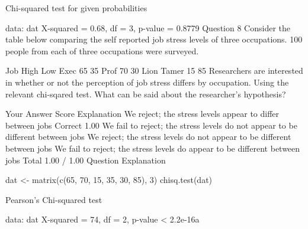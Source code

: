     Chi-squared test for given probabilities

data:  dat 
X-squared = 0.68, df = 3, p-value = 0.8779
Question 8
Consider the table below comparing the self reported job stress levels of three occupations. 100 people from each of three occupations were surveyed.

Job	High	Low
Exec	65	35
Prof	70	30
Lion Tamer	15	85
Researchers are interested in whether or not the perception of job stress differs by occupation. Using the relevant chi-sqared test. What can be said about the researcher's hypothesis?

Your Answer		Score	Explanation
We reject; the stress levels appear to differ between jobs	Correct	1.00	
We fail to reject; the stress levels do not appear to be different between jobs			
We reject; the stress levels do not appear to be different between jobs			
We fail to reject; the stress levels do appear to be different between jobs			
Total		1.00 / 1.00	
Question Explanation

dat <- matrix(c(65, 70, 15, 35, 30, 85), 3)
chisq.test(dat)

    Pearson's Chi-squared test

data:  dat 
X-squared = 74, df = 2, p-value < 2.2e-16a
